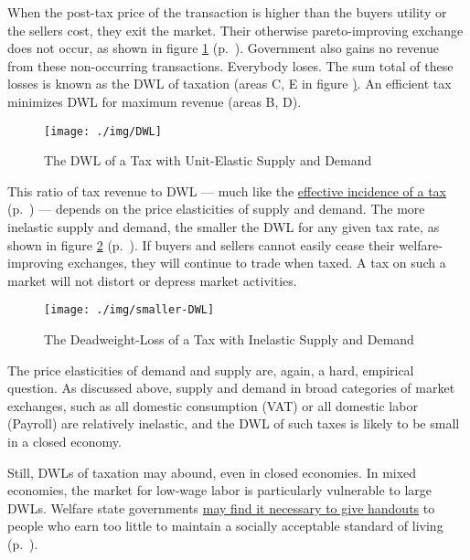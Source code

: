 When the post-tax price of the transaction is higher than the buyers utility or the sellers cost, they exit the market. Their otherwise pareto-improving exchange does not occur, as shown in figure \ref{fig:DWL} (p.~\pageref{fig:DWL}). Government also gains no revenue from these non-occurring transactions. Everybody loses. The sum total of these losses is known as the \gls{DWL} of taxation (areas C, E in figure \href{fig:DWL}). An efficient tax minimizes \gls{DWL} for maximum revenue (areas B, D).

\begin{figure}[htbp]
	\centering
	\texttt{[image: ./img/DWL]}
	\caption[Deadweight-Loss of a Tax with Unit-Elastic Supply and Demand]{The \gls{DWL} of a Tax with Unit-Elastic Supply and Demand}
	\label{fig:DWL}
\end{figure}

This ratio of tax revenue to \gls{DWL} --- much like the \hyperref[sec:well-determinedincidence]{effective incidence of a tax} (p.~\pageref{sec:well-determinedincidence}) --- depends on the price elasticities of supply and demand. The more inelastic supply and demand, the smaller the \gls{DWL} for any given tax rate, as shown in figure \ref{fig:smaller-DWL} (p.~\pageref{fig:smaller-DWL}). If buyers and sellers cannot easily cease their welfare-improving exchanges, they will continue to trade when taxed. A tax on such a market will not distort or depress market activities.

\begin{figure}[htbp]
	\centering
	\texttt{[image: ./img/smaller-DWL]}
	\caption[Deadweight-Loss of a Tax with Inelastic Suppy and Demand]{The Deadweight-Loss of a Tax with Inelastic Supply and Demand}
	\label{fig:smaller-DWL}
\end{figure}

The price elasticities of demand and supply are, again, a hard, empirical question. As discussed above, supply and demand in broad categories of market exchanges, such as all domestic consumption (\gls{VAT}) or all domestic labor (\gls{Payroll}) are relatively inelastic, and the \gls{DWL} of such taxes is likely to be small in a closed economy.

Still, \glspl{DWL} of taxation may abound, even in closed economies. In mixed economies, the market for low-wage labor is particularly vulnerable to large \gls{DWL}s. Welfare state governments  \hyperref[sec:distribution]{may find it necessary to give handouts} to people who earn too little to maintain a socially acceptable standard of living (p.~\pageref{sec:distribution}).

